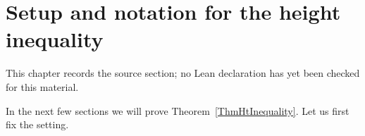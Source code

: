 \chapter{Setup and notation for the height inequality}
\label{uniformity-mordell-lang-curves-chapter-03}

\begin{remark}
\label{uniformity-mordell-lang-curves-chapter-03-source}
This chapter records the source section; no Lean declaration has yet been checked for this material.
\notready
\end{remark}

\label{SectionSettingUpHtIneq}

In the next few sections we will prove Theorem~\ref{ThmHtInequality}.
Let us first fix  the setting.

